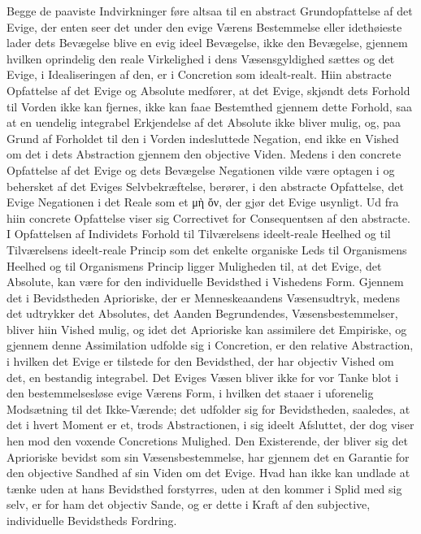 \documentclass[12pt,a4paper]{book}
\newcommand{\opage}[1]{\marginnote{\footnotesize\textit{[#1]}}}
\begin{document}
Begge de paaviste Indvirkninger føre altsaa til en abstract Grundopfattelse af det Evige, der
enten seer det under den evige Værens Bestemmelse eller idethøieste lader dets Bevægelse blive
en evig ideel Bevægelse, ikke den Bevægelse, gjennem hvilken oprindelig den reale Virkelighed i
dens Væsensgyldighed sættes og det Evige, i Idealiseringen af den, er i Concretion som
idealt-realt. Hiin abstracte Opfattelse af det Evige og Absolute medfører, at det Evige, skjøndt
dets Forhold til Vorden ikke kan fjernes, ikke kan faae Bestemthed gjennem dette Forhold, saa at
en uendelig integrabel Erkjendelse af det Absolute ikke bliver mulig, og, paa Grund af Forholdet
til den i Vorden indesluttede Negation, end ikke en Vished om det i dets Abstraction gjennem den
objective Viden. Medens i den concrete Opfattelse \opage{218}af det Evige og dets Bevægelse Negationen vilde
være optagen i og behersket af det Eviges Selvbekræftelse, berører, i den abstracte Opfattelse,
det Evige Negationen i det Reale som et μὴ ὄν, der gjør det Evige usynligt.
Ud fra hiin concrete Opfattelse viser sig Correctivet for Consequentsen af den abstracte. I
Opfattelsen af Individets Forhold til Tilværelsens ideelt-reale Heelhed og til Tilværelsens
ideelt-reale Princip som det enkelte organiske Leds til Organismens Heelhed og til Organismens
Princip ligger Muligheden til, at det Evige, det Absolute, kan være for den individuelle
Bevidsthed i Vishedens Form. Gjennem det i Bevidstheden Aprioriske, der er Menneskeaandens
Væsensudtryk, medens det udtrykker det Absolutes, det Aanden Begrundendes, Væsensbestemmelser,
bliver hiin Vished mulig, og idet det Aprioriske kan assimilere det Empiriske, og gjennem denne
Assimilation udfolde sig i Concretion, er den relative Abstraction, i hvilken det Evige er
tilstede for den Bevidsthed, der har objectiv Vished om det, en bestandig integrabel. Det Eviges
Væsen bliver ikke for vor Tanke blot i den bestemmelsesløse evige Værens Form, i hvilken det
staaer i uforenelig Modsætning til det Ikke-Værende; det udfolder sig for Bevidstheden, saaledes,
at det i hvert Moment er et, trods Abstractionen, i sig ideelt Afsluttet, der dog viser hen mod
den voxende Concretions Mulighed. Den Existerende, der bliver sig det Aprioriske bevidst som sin
Væsensbestemmelse, har gjennem det en Garantie for den objective Sandhed af sin Viden om det
Evige. Hvad han ikke kan undlade at tænke uden at hans Bevidsthed forstyrres, uden at den kommer
i Splid med sig selv, er for ham det objectiv Sande, og er dette i Kraft af den subjective,
individuelle Bevidstheds Fordring.
\end{document}
